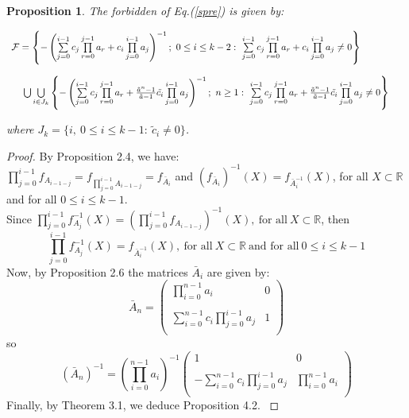 \documentclass[11pt]{amsart}
\newtheorem{prop}[thm]{Proposition}
\theoremstyle{definition}
\theoremstyle{remark}
\theoremstyle{example}
\numberwithin{equation}{section}
\begin{document}
\begin{prop}\rm{
The forbidden of Eq.(\ref{spre}) is given by:\\
\vspace{1mm}

\noindent
$
\begin{array}{c}\mathcal{F}=\left\{-\left(\sum\limits_{j=0}^{i-1}c_j
\prod\limits_{r=0}^{j-1} a_r+c_i\prod\limits_{j=0}^{i-1} a_j\right)^{-1}; \ 0\leq i\leq k-2: \ \sum\limits_{j=0}^{i-1}c_j
\prod\limits_{r=0}^{j-1} a_r+c_i\prod\limits_{j=0}^{i-1} a_j\neq0\right\} \hspace{1.5cm}\\
\\
\bigcup\bigcup\limits_{i \in J_k}\left\{-\left(\sum\limits_{j=0}^{i-1}c_j\prod\limits_{r=0}^{j-1} a_r+\frac{\tilde{a}^n-1}{\tilde{a}-1}\tilde{c_i}\prod\limits_{j=0}^{i-1} a_j\right)^{-1}; \ n\geq1: \ \sum\limits_{j=0}^{i-1}c_j\prod\limits_{r=0}^{j-1} a_r+\frac{\tilde{a}^n-1}{\tilde{a}-1}\tilde{c_i}\prod\limits_{j=0}^{i-1} a_j\neq0\right\}\end{array}$\\
\vspace{5mm}

where $J_k=\{i, \ 0\leq i\leq k-1: \ \tilde{c}_i\neq0\}$.
}\end{prop}
\medskip
\begin{proof}\rm{
By Proposition 2.4, we have:\\
\vspace{2mm}
\noindent
$\prod\limits_{j=0}^{i-1}f_{A_{i-1-j}}=f_{\prod\limits_{j=0}^{i-1}A_{i-1-j}}=f_{\bar{A}_i}$
and $(f_{\bar{A}_i})^{-1}(X)=f_{\bar{A}_i^{-1}}(X)$, for all $X\subset\mathbb{R}$
\vspace{2mm}
\noindent
and for all $0\leq i\leq k-1$.\\
\vspace{2mm}
\noindent
Since $\prod\limits_{j=0}^{i-1}f_{A_j}^{-1}(X)=
\left(\prod\limits_{j=0}^{i-1}f_{A_{i-1-j}}\right)^{-1}(X), \ \text{for all} \ X\subset\mathbb{R}$, then
\vspace{-1mm}
$$\prod\limits_{j=0}^{i-1}f_{A_j}^{-1}(X)=f_{\bar{A}_i^{-1}}(X), \ \text{for all} \ X\subset\mathbb{R} \ \text{and for all} \ 0\leq i\leq k-1$$
\vspace{1mm}
\noindent
Now, by Proposition 2.6 the matrices $\bar{A}_i$ are given by:
$$\bar{A}_n=\left(\begin{array}{cc}
\prod\limits_{i=0}^{n-1} a_i & 0 \\
                         \\
\sum\limits_{i=0}^{n-1}c_i\prod\limits_{j=0}^{i-1}a_j & 1\\
\end{array}\right)$$
so
$$(\bar{A}_n)^{-1}=\left(\prod\limits_{i=0}^{n-1} a_i\right)^{-1}\left(\begin{array}{cc}
1 & 0 \\
                         \\
-\sum\limits_{i=0}^{n-1}c_i\prod\limits_{j=0}^{i-1}a_j & \prod\limits_{i=0}^{n-1} a_i\\
\end{array}\right)$$
Finally, by Theorem 3.1,  we deduce Proposition 4.2.
}\end{proof}
\medskip
\end{document}
